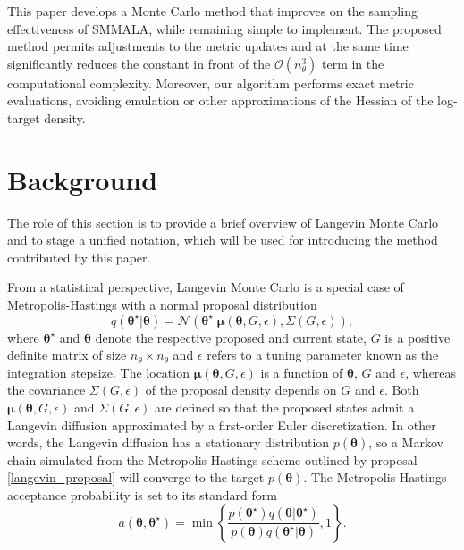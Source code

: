 \documentclass[twoside,11pt]{article}
\begin{document}
This paper develops a Monte Carlo method that improves on the sampling effectiveness of SMMALA, while remaining simple to implement.  The proposed method permits adjustments to the metric updates and at the same time significantly reduces the constant in front of the $\mathcal{O}(n_\theta^3)$ term in the computational complexity. Moreover, our algorithm performs exact metric evaluations, avoiding emulation or other 
approximations of the Hessian of the log-target density.

\section{Background}

The role of this section is to provide a brief overview of Langevin Monte Carlo and to stage a unified notation, which will
be used for introducing the method contributed by this paper.

From a statistical perspective, Langevin Monte Carlo is a special case of Metropolis-Hastings with a normal proposal
distribution
\begin{equation}
\label{langevin_proposal}
q(\boldsymbol{\theta}^{\star}|\boldsymbol{\theta}) =
\mathcal{N}(\boldsymbol{\theta}^{\star}|\boldsymbol{\mu}(\boldsymbol{\theta}, G, \epsilon), \Sigma(G, \epsilon)),
\end{equation}
where $\boldsymbol{\theta}^{\star}$ and $\boldsymbol{\theta}$ denote the respective proposed and current state, $G$ is a
positive definite matrix of size $n_{\theta} \times n_{\theta}$ and $\epsilon$ refers to a tuning parameter known as the
integration stepsize. The location $\boldsymbol{\mu}(\boldsymbol{\theta}, G, \epsilon)$ is a function of 
$\boldsymbol{\theta}$, $G$ and $\epsilon$, whereas the covariance $\Sigma(G, \epsilon)$ of the proposal density depends on 
$G$ and $\epsilon$. Both $\boldsymbol{\mu}(\boldsymbol{\theta}, G, \epsilon)$ and $\Sigma(G, \epsilon)$ are defined so that 
the proposed states admit a Langevin diffusion approximated by a first-order Euler discretization. In other words, the 
Langevin diffusion has a stationary distribution $p(\boldsymbol{\theta})$, so a Markov chain simulated from the 
Metropolis-Hastings scheme outlined by proposal \eqref{langevin_proposal} will converge to the target 
$p(\boldsymbol{\theta})$. The Metropolis-Hastings acceptance probability is set to its standard form
\begin{equation}
\label{langevin_acceptance}
a(\boldsymbol{\theta},\boldsymbol{\theta}^{\star}) =
\min\left\{
\frac{p(\boldsymbol{\theta}^{\star})q(\boldsymbol{\theta}|\boldsymbol{\theta}^{\star})}
{p(\boldsymbol{\theta})q(\boldsymbol{\theta}^{\star}|\boldsymbol{\theta})}
, 1
\right\}.
\end{equation}
\end{document}
